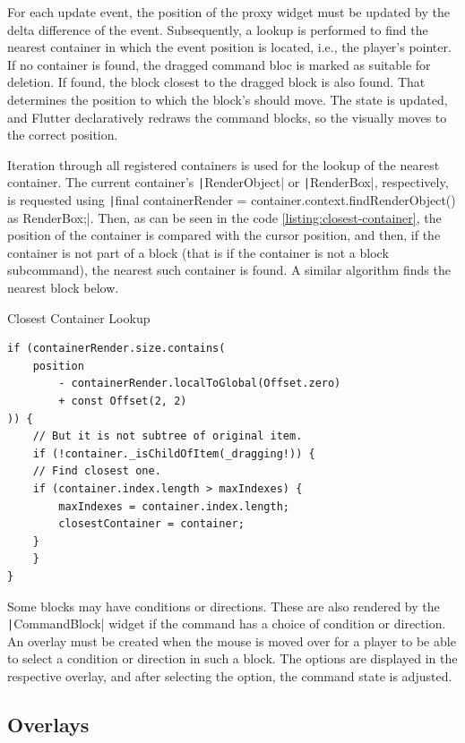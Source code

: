 For each update event, the position of the proxy widget must be updated by the delta difference of the event.
Subsequently, a lookup is performed to find the nearest container in which the event position is located, i.e., the player's pointer.
If no container is found, the dragged command bloc is marked as suitable for deletion.
If found, the block closest to the dragged block is also found.
That determines the position to which the block's  should move.
The state is updated, and Flutter declaratively redraws the command blocks, so the  visually moves to the correct position.

Iteration through all registered containers is used for the lookup of the nearest container.
The current container's \texttt|RenderObject| or \texttt|RenderBox|, respectively, is requested using \texttt|final containerRender = container.context.findRenderObject() as RenderBox;|.
Then, as can be seen in the code \ref{listing:closest-container}, the position of the container is compared with the cursor position, and then, if the container is not part of a block (that is if the container is not a block subcommand), the nearest such container is found.
A similar algorithm finds the nearest block below.

\begin{listing}
    \caption{Closest Container Lookup}
    \label{listing:closest-container}
    \begin{verbatim}
if (containerRender.size.contains(
    position 
        - containerRender.localToGlobal(Offset.zero) 
        + const Offset(2, 2)
)) {
    // But it is not subtree of original item.
    if (!container._isChildOfItem(_dragging!)) {
    // Find closest one.
    if (container.index.length > maxIndexes) {
        maxIndexes = container.index.length;
        closestContainer = container;
    }
    }
}
    \end{verbatim}
\end{listing}

Some blocks may have conditions or directions.
These are also rendered by the \texttt|CommandBlock| widget if the command has a choice of condition or direction.
An overlay must be created when the mouse is moved over for a player to be able to select a condition or direction in such a block.
The options are displayed in the respective overlay, and after selecting the option, the command state is adjusted.

\subsection{Overlays}

